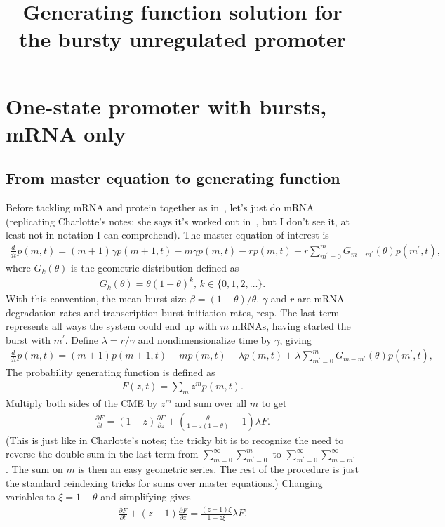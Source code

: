 \documentclass[12pt]{article}%
\newcommand{\deriv}[2][{}]{\frac{d #1}{d #2}}
\newcommand{\pderiv}[2][{}]{\frac{\partial #1}{\partial #2}}
\begin{document}
\title{Generating function solution for the bursty unregulated promoter}

\maketitle

\section{One-state promoter with bursts, mRNA only}

\subsection{From master equation to generating function}
Before tackling mRNA and protein together as in~\cite{Shahrezaei2008}, let's
just do mRNA (replicating Charlotte's notes; she says it's worked out
in~\cite{Paulsson2000}, but I don't see it, at least not in notation I can
comprehend). The master equation of interest is
\begin{align}
\deriv{t}p(m,t) = (m+1)\gamma p(m+1,t) - m\gamma p(m,t) - r p(m,t)
        + r \sum_{m^\prime=0}^m G_{m-m^\prime}(\theta) p(m^\prime,t),
\label{eq:1state_unreg_003}
\end{align}
where $G_{k}(\theta)$ is the geometric distribution defined as
\begin{align}
G_{k}(\theta) = \theta(1 - \theta)^k, \, k\in\{0,1,2,\dots\}.
\end{align}
With this convention, the mean burst size $\beta = (1-\theta)/\theta$.
$\gamma$ and $r$ are mRNA degradation rates and transcription burst
initiation rates, resp. The last term represents all ways the system could
end up with $m$ mRNAs, having started the burst with $m^\prime$. Define
$\lambda = r/\gamma$ and nondimensionalize time by $\gamma$, giving
\begin{align}
\deriv{t}p(m,t) = (m+1)p(m+1,t) - m p(m,t) - \lambda p(m,t)
        + \lambda \sum_{m^\prime=0}^m G_{m-m^\prime}(\theta) p(m^\prime,t),
\end{align}
The probability generating function is defined as
\begin{align}
F(z,t) = \sum_m z^m p(m,t).
\end{align}
Multiply both sides of the CME by $z^m$ and sum over all $m$ to get
\begin{align}
\pderiv[F]{t} = (1 - z) \pderiv[F]{z}
        + \left(\frac{\theta}{1-z(1-\theta)}-1\right)\lambda F.
\end{align}
(This is just like in Charlotte's notes; the tricky bit is to
recognize the need to reverse the double sum in the last term from
$\sum_{m=0}^\infty\sum_{m^\prime=0}^m$ to
$\sum_{m^\prime=0}^\infty\sum_{m=m^\prime}^\infty$.
The sum on $m$ is then an easy geometric series. The rest of the procedure
is just the standard reindexing tricks for sums over master equations.)
Changing variables to $\xi=1-\theta$ and simplifying gives
\begin{align}
\pderiv[F]{t} + (z - 1) \pderiv[F]{z} = \frac{(z-1)\xi}{1-z\xi}\lambda F.
\label{eq:1state_unreg_015}
\end{align}
\end{document}
